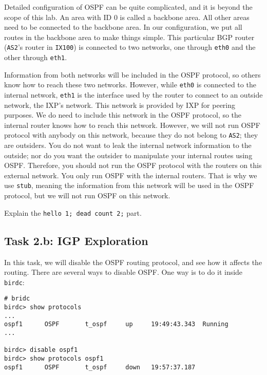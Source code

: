 Detailed configuration of OSPF can be quite complicated, and it is beyond the
scope of this lab.
An area with ID 0 is called a backbone area. All other areas need
to be connected to the backbone area. In our configuration, we put all routes
in the backbone area to make things simple. This
particular BGP router (\texttt{AS2}'s router in \texttt{IX100})
is connected to two networks, one through \texttt{eth0} and the other
through \texttt{eth1}.

Information from both networks will be included in the OSPF protocol,
so others know how to reach these two networks. However,
while \texttt{eth0} is connected to the internal network,
\texttt{eth1} is the interface used by the router
to connect to an outside network, the IXP's network. This network is provided
by IXP for peering purposes. We do need to include this network in the OSPF
protocol, so the internal router knows how to reach this network. However, we
will not run OSPF protocol with anybody on this network, because they
do not belong to \texttt{AS2}; they are outsiders.
You do not want to leak the internal network information to the outside;
nor do you want the outsider to manipulate your internal routes using OSPF.
Therefore, you should not run the OSPF protocol with
the routers on this external network.
You only run OSPF with the internal routers.
That is why we use \texttt{stub}, meaning the information from this network
will be used in the OSPF protocol, but we will not run OSPF on
this network.

Explain the \texttt{hello 1; dead count 2;} part. 



\subsection{Task 2.b: IGP Exploration} 

In this task, we will disable the OSPF routing protocol, and see 
how it affects the routing. There are several ways to disable
OSPF. One way is to do it inside \texttt{birdc}: 

\begin{lstlisting}
# bridc
birdc> show protocols
...
ospf1      OSPF       t_ospf     up     19:49:43.343  Running
...

birdc> disable ospf1
birdc> show protocols ospf1
ospf1      OSPF       t_ospf     down   19:57:37.187
\end{lstlisting}
 

